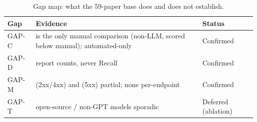 \begin{table}[tb]
\centering
\caption{Gap map: what the 59-paper base does and does not establish.}
\label{tab:gapmap}
\footnotesize
\begin{tabular}{@{}p{1.5cm}p{7.6cm}p{2.0cm}@{}}
\toprule
\textbf{Gap} & \textbf{Evidence} & \textbf{Status} \\
\midrule
GAP-C & \cite{evomaster} is the only manual comparison (non-LLM, scored below manual); \cite{llamaresttest,autoresttest,notimetorest} automated-only & Confirmed \\
GAP-D & \cite{llamaresttest,autoresttest,logiagent,notimetorest,evomaster,morest} report counts, never Recall & Confirmed \\
GAP-M & \cite{kat} (2xx/4xx) and \cite{restspecit} (5xx) partial; none per-endpoint & Confirmed \\
GAP-T & open-source / non-GPT models sporadic & Deferred (ablation) \\
\bottomrule
\end{tabular}
\end{table}
